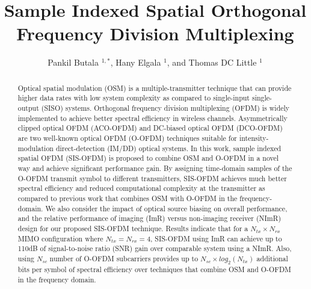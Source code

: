 \documentclass[12pt,letterpaper,onecolumn]{article} %
\begin{document}
\title{Sample Indexed Spatial Orthogonal Frequency Division Multiplexing}

\renewcommand{\baselinestretch}{0.9}
\begin{center}
\begin{CJK*}{GBK}{kai}
\author{Pankil Butala $^{1,*}$, Hany Elgala $^1$,  and Thomas DC Little $^1$\\}
\end{CJK*}
\end{center}
\address{
\emph{$^1$\emph{Department of Electrical and Computer Engineering,\\ Boston University, Boston, MA 02215, USA\\}}
$^*$\emph{Corresponding author: pbutala@bu.edu}
}
\begin{abstract} 
Optical spatial modulation (OSM) is a multiple-transmitter technique that can provide higher data rates with low system complexity as compared to single-input single-output (SISO) systems. Orthogonal frequency division multiplexing (OFDM) is widely implemented to achieve better spectral efficiency in wireless channels. Asymmetrically clipped optical OFDM (ACO-OFDM) and DC-biased optical OFDM (DCO-OFDM) are two well-known optical OFDM (O-OFDM) techniques suitable for intensity-modulation direct-detection (IM/DD) optical systems. In this work, sample indexed spatial OFDM (SIS-OFDM) is proposed to combine OSM and O-OFDM in a novel way and achieve significant performance gain. By assigning time-domain samples of the O-OFDM transmit symbol to different transmitters, SIS-OFDM achieves much better spectral efficiency and reduced computational complexity at the transmitter as compared to previous work that combines OSM with O-OFDM in the frequency-domain. We also consider the impact of optical source biasing on overall performance, and the relative performance of imaging (ImR) versus non-imaging receiver (NImR) design for our proposed SIS-OFDM technique. Results indicate that for a $N_{tx}\times N_{rx}$ MIMO configuration where $N_{tx}=N_{rx}=4$, SIS-OFDM using ImR can achieve up to 110dB of signal-to-noise ratio (SNR) gain over comparable system using a NImR. Also, using $N_{sc}$ number of O-OFDM subcarriers provides up to $N_{sc}\times log_2(N_{tx})$ additional bits per symbol of spectral efficiency over techniques that combine OSM and O-OFDM in the frequency domain.
\end{abstract} 

\end{document}
